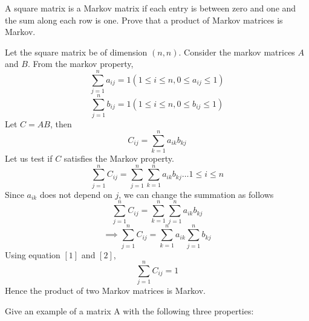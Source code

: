 \documentclass[solution,addpoints,12pt]{exam}
\newenvironment{Solution}{\begin{solution}}{\end{solution}}
\begin{document}
\begin{questions}
\question A square matrix is a Markov matrix if each entry is between zero and one and the sum along each row is one. Prove that a product of Markov matrices is Markov.
\begin{Solution}
Let the square matrix be of dimension $(n,n)$. Consider the markov matrices $A$ and $B$. From the markov property,
\begin{equation}
\sum_{j=1}^{n}a_{ij} = 1 ( 1\leq i \leq n, 0\leq a_{ij} \leq 1)
\end{equation}
\begin{equation}
\sum_{j=1}^{n}b_{ij} = 1  (1\leq i \leq n, 0\leq b_{ij} \leq 1)
\end{equation}
Let $C = AB$, then
\[C_{ij} = \sum_{k=1}^{n}a_{ik}b_{kj}\]
Let us test if $C$ satisfies the Markov property.
\[\sum_{j=1}^{n}C_{ij} = \sum_{j=1}^{n}\sum_{k=1}^{n}a_{ik}b_{kj} \dots 1 \leq i \leq n\]
Since $a_{ik}$ does not depend on $j$, we can change the summation as follows
\[\sum_{j=1}^{n}C_{ij} = \sum_{k=1}^{n}\sum_{j=1}^{n}a_{ik}b_{kj}\]
\[\implies \sum_{j=1}^{n}C_{ij} = \sum_{k=1}^{n}a_{ik}\sum_{j=1}^{n}b_{kj}\]
Using equation $[1]$ and $[2]$, 
\[\sum_{j=1}^{n}C_{ij} = 1\]
Hence the product of two Markov matrices is Markov.
\end{Solution}


\question  Give an example of a matrix A with the following three properties:
\end{questions}
\end{document}
